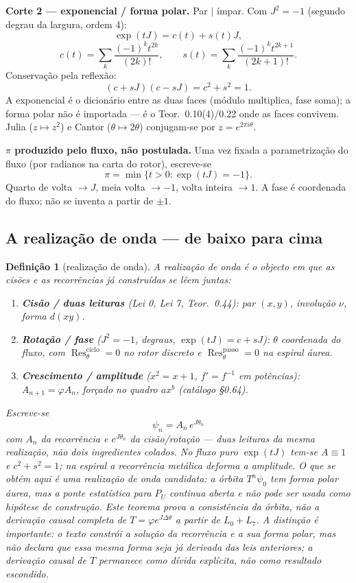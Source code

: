 \documentclass[11pt,a4paper]{article}
\newtheorem{definicao}[teorema]{Definição}
\begin{document}
\textbf{Corte 2 --- exponencial / forma polar.}
Par $\mid$ ímpar. Com $J^2=-1$ (segundo degrau da largura, ordem 4):
\[
\exp(tJ)=c(t)+s(t)J,
\]
\[
c(t)=\sum_k\frac{(-1)^k t^{2k}}{(2k)!},\qquad
s(t)=\sum_k\frac{(-1)^k t^{2k+1}}{(2k+1)!}.
\]
Conservação pela reflexão:
\[
(c+sJ)(c-sJ)=c^2+s^2=1.
\]
A exponencial é o dicionário entre as duas faces (módulo multiplica, fase soma);
a forma polar não é importada --- é o Teor.~0.10(4)/0.22 onde as faces convivem.
Julia ($z\mapsto z^2$) e Cantor ($\theta\mapsto 2\theta$) conjugam-se por $z=e^{2\pi i\theta}$.

\textbf{$\pi$ produzido pelo fluxo, não postulada.}
Uma vez fixada a parametrização do fluxo (por radianos na carta do rotor), escreve-se
\[
\pi=\min\{t>0:\exp(tJ)=-1\}.
\]
Quarto de volta $\to J$, meia volta $\to-1$, volta inteira $\to 1$.
A fase é coordenada do fluxo; não se inventa a partir de $\pm1$.

\subsection{A realização de onda --- de baixo para cima}

\begin{definicao}[realização de onda]
\label{def:psi}
A realização de onda é o objecto em que as cisões e as recorrências já construídas se lêem juntas:
\begin{enumerate}[leftmargin=1.2em,itemsep=2pt]
  \item \textbf{Cisão / duas leituras} (Lei 0, Lei 7, Teor.~0.44): par $(x,y)$, involução $\nu$,
        forma $d(xy)$.
  \item \textbf{Rotação / fase} ($J^2=-1$, degraus, $\exp(tJ)=c+sJ$):
        $\theta$ coordenada do fluxo, com $\operatorname{Res}^{\mathrm{ciclo}}_\theta=0$ no rotor discreto
        e $\operatorname{Res}^{\mathrm{passo}}_\theta=0$ na espiral áurea.
  \item \textbf{Crescimento / amplitude} ($x^2=x+1$, $f'=f^{-1}$ em potências):
        $A_{n+1}=\varphi A_n$, forçado no quadro $ax^b$ (catálogo §0.64).
\end{enumerate}
Escreve-se
\[
\boxed{\psi_n=A_n\,e^{J\theta_n}}
\]
com $A_n$ da recorrência e $e^{J\theta_n}$ da cisão/rotação --- duas leituras da mesma realização,
não dois ingredientes colados. No fluxo puro $\exp(tJ)$ tem-se $A\equiv 1$ e $c^2+s^2=1$;
na espiral a recorrência metálica deforma a amplitude. O que se obtém aqui é uma
\emph{realização de onda candidata}: a órbita $T^n\psi_0$ tem forma polar áurea, mas a ponte
estatística para $P_U$ continua aberta e não pode ser usada como hipótese de construção.
Este teorema prova a \emph{consistência} da órbita, não a derivação causal completa de
$T=\varphi e^{J\Delta\theta}$ a partir de $L_0+L_7$. A distinção é importante: o texto
constrói a solução da recorrência e a sua forma polar, mas não declara que essa mesma forma seja
já derivada das leis anteriores; a derivação causal de $T$ permanece como dívida explícita, não como
resultado escondido.
\end{definicao}
\end{document}
